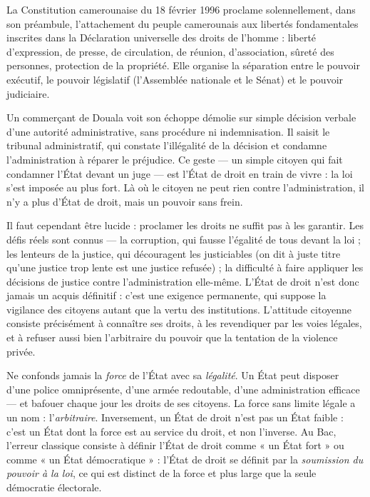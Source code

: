 \documentclass[11pt]{article}
\newcommand{\cle}[1]{{\popxbold\color{popdark}#1}}
\newcounter{popsec}
\newcounter{popsub}
\newcommand{\courssub}[1]{%
  \stepcounter{popsub}%
  \par\vspace{9pt}\noindent{\popxbold\fontsize{11.5}{13}\selectfont\color{popink}{\color{poporange}\thepopsec.\thepopsub}\hspace{6pt}#1}\par\nopagebreak\vspace{4pt}
}
\begin{document}
\courssub{Application au Cameroun : l'État de droit en chantier}

La Constitution camerounaise du 18 février 1996 proclame solennellement, dans son préambule, l'attachement du peuple camerounais aux libertés fondamentales inscrites dans la Déclaration universelle des droits de l'homme : liberté d'expression, de presse, de circulation, de réunion, d'association, sûreté des personnes, protection de la propriété. Elle organise la séparation entre le pouvoir exécutif, le pouvoir législatif (l'Assemblée nationale et le Sénat) et le pouvoir judiciaire.

\begin{exemplebox}
Un commerçant de Douala voit son échoppe démolie sur simple décision verbale d'une autorité administrative, sans procédure ni indemnisation. Il saisit le tribunal administratif, qui constate l'illégalité de la décision et condamne l'administration à réparer le préjudice. Ce geste — un simple citoyen qui fait condamner l'État devant un juge — est l'État de droit en train de vivre : la loi s'est imposée au plus fort. Là où le citoyen ne peut rien contre l'administration, il n'y a plus d'État de droit, mais un pouvoir sans frein.
\end{exemplebox}

Il faut cependant être lucide : proclamer les droits ne suffit pas à les garantir. Les défis réels sont connus — la \cle{corruption}, qui fausse l'égalité de tous devant la loi ; les \cle{lenteurs de la justice}, qui découragent les justiciables (on dit à juste titre qu'une justice trop lente est une justice refusée) ; la difficulté à faire appliquer les décisions de justice contre l'administration elle-même. L'État de droit n'est donc jamais un acquis définitif : c'est une exigence permanente, qui suppose la vigilance des citoyens autant que la vertu des institutions. L'attitude citoyenne consiste précisément à connaître ses droits, à les revendiquer par les voies légales, et à refuser aussi bien l'arbitraire du pouvoir que la tentation de la violence privée.

\begin{attention}
Ne confonds jamais la \emph{force} de l'État avec sa \emph{légalité}. Un État peut disposer d'une police omniprésente, d'une armée redoutable, d'une administration efficace — et bafouer chaque jour les droits de ses citoyens. La force sans limite légale a un nom : l'\emph{arbitraire}. Inversement, un État de droit n'est pas un État faible : c'est un État dont la force est au service du droit, et non l'inverse. Au Bac, l'erreur classique consiste à définir l'État de droit comme « un État fort » ou comme « un État démocratique » : l'État de droit se définit par la \emph{soumission du pouvoir à la loi}, ce qui est distinct de la force et plus large que la seule démocratie électorale.
\end{attention}
\end{document}
